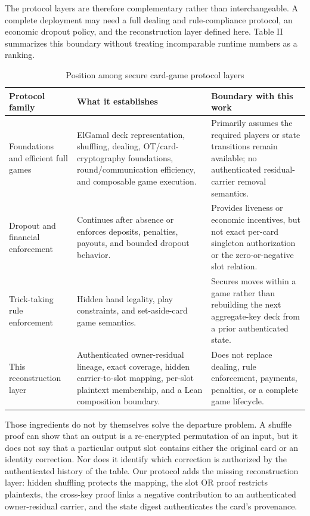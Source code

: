 \documentclass[11pt]{article}
\begin{document}
The protocol layers are therefore complementary rather than interchangeable. A complete deployment may need a full dealing and rule-compliance protocol, an economic dropout policy, and the reconstruction layer defined here. Table II summarizes this boundary without treating incomparable runtime numbers as a ranking.

\begin{table}[htbp]
\centering
\footnotesize
\caption{Position among secure card-game protocol layers}
\begin{tabularx}{\textwidth}{>{\RaggedRight}X >{\RaggedRight}X >{\RaggedRight}X}
\toprule
Protocol family & What it establishes & Boundary with this work \\
\midrule
Foundations and efficient full games \cite{ref9,ref41,ref42,ref43,ref45,ref46,ref49} & ElGamal deck representation, shuffling, dealing, OT/card-cryptography foundations, round/communication efficiency, and composable game execution. & Primarily assumes the required players or state transitions remain available; no authenticated residual-carrier removal semantics. \\
Dropout and financial enforcement \cite{ref7,ref12,ref13,ref14,ref44} & Continues after absence or enforces deposits, penalties, payouts, and bounded dropout behavior. & Provides liveness or economic incentives, but not exact per-card singleton authorization or the zero-or-negative slot relation. \\
Trick-taking rule enforcement \cite{ref47,ref48} & Hidden hand legality, play constraints, and set-aside-card game semantics. & Secures moves within a game rather than rebuilding the next aggregate-key deck from a prior authenticated state. \\
This reconstruction layer & Authenticated owner-residual lineage, exact coverage, hidden carrier-to-slot mapping, per-slot plaintext membership, and a Lean composition boundary. & Does not replace dealing, rule enforcement, payments, penalties, or a complete game lifecycle. \\
\bottomrule
\end{tabularx}
\end{table}

Those ingredients do not by themselves solve the departure problem. A shuffle proof can show that an output is a re-encrypted permutation of an input, but it does not say that a particular output slot contains either the original card or an identity correction. Nor does it identify which correction is authorized by the authenticated history of the table. Our protocol adds the missing reconstruction layer: hidden shuffling protects the mapping, the slot OR proof restricts plaintexts, the cross-key proof links a negative contribution to an authenticated owner-residual carrier, and the state digest authenticates the card’s provenance.
\end{document}
